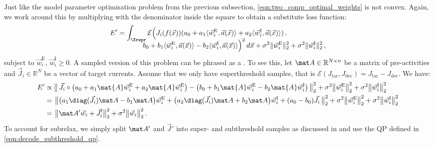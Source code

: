 Just like the model parameter optimisation problem from the previous subsection, \cref{eqn:two_comp_optimal_weights} is not convex.
Again, we work around this by multiplying with the denominator inside the square to obtain a substitute loss function:
\begin{align}
	\begin{aligned}
	E' &=
		\int_{\Xrepr} \mathcal{E}
		\Bigl(
			J_i(f(\vec x)) (a_0 + a_1 \langle \vec w^\mathrm{E}_i, \vec a(\vec x) \rangle + a_2 \langle \vec w^\mathrm{I}_i, \vec a(\vec x) \rangle )\,, \\[-1em]
		&\hspace{3.66em}		
		b_0 + b_1 \langle \vec w^\mathrm{E}_i, \vec a(\vec x) \rangle - b_2 \langle \vec w^\mathrm{I}_i, \vec a(\vec x) \rangle
		\Bigr)^2 \, d\vec x
		 + \sigma^2 \| \vec w^\mathrm{E}_i \|^2_2 + \sigma^2 \| \vec w^\mathrm{I}_i \|^2_2 \,,
	\end{aligned}
	\label{eqn:two_comp_optimal_weights_prime}
\end{align}
subject to $\vec w^\mathrm{E}_i$, $\vec w^\mathrm{I}_i \geq 0$.
A sampled version of this problem can be phrased as a \qprog.
To see this, let $\mat A \in \mathbb{R}^{N \times n}$ be a matrix of pre-activities and $\vec J_i \in \mathbb{R}^{N}$ be a vector of target currents.
Assume that we only have superthreshold samples, that is $\mathcal{E}(J_\mathrm{tar}, J_\mathrm{dec}) = J_\mathrm{tar} - J_\mathrm{dec}$. We have:
\begin{align}
	E' &\propto \bigl\|	\,
		  \vec J_i \circ
		  	\bigl(
		  		a_0 +
		  		a_1 \mat{A} \vec w_i^\mathrm{E} +
		  		a_2 \mat{A} \vec w_i^\mathrm{E} \bigr)
	      - \bigl(
	      		b_0 +
	      		b_1 \mat{A} \vec w_i^\mathrm{E} -
	      		b_2 \mat{A} \vec w_i^\mathrm{I} \bigr)
	\, \bigr\|_2^2
	+ \sigma^2 \bigl\| \vec w^\mathrm{E}_i \bigr\|^2_2 + \sigma^2 \bigl\| \vec w^\mathrm{I}_i \bigr\|^2_2 \notag \\
		&= \hspace{0.125em} \bigl\|
			\bigl(a_1 \diag(\vec J_i) \mat A - b_1 \mat A \bigr) \vec w_i^\mathrm{E}
			+ \bigl(a_2 \diag(\vec J_i) \mat A + b_2 \mat A \bigr) \vec w_i^\mathrm{I}
			+ (a_0 - b_0) \vec J_i
	\, \bigr\|_2^2
	+ \sigma^2 \bigl\| \vec w^\mathrm{E}_i \bigr\|^2_2 
	+ \sigma^2 \bigl\| \vec w^\mathrm{I}_i \bigr\|^2_2  \notag \\
	&= \hspace{0.125em} \bigl\|
		\mat A' \vec w_i + \vec J_i'
	\bigr\|_2^2
	+ \sigma^2 \bigl\| \vec w_i \bigr\|^2_2  \,.
	\label{eqn:two_comp_optimal_weights_prime_matrix}
\end{align}
To account for \gls{subrelax}, we simply split $\mat A'$ and $\vec J'$ into super- and subthreshold samples as discussed in  and use the QP defined in \cref{eqn:decode_subthreshold_qp}.

